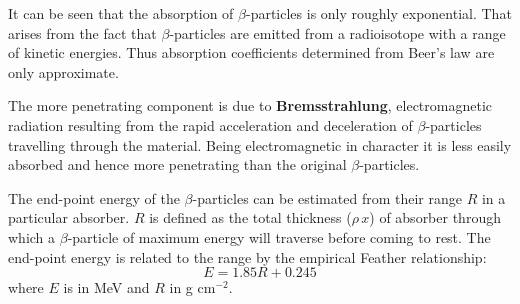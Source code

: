 It can be seen that the absorption of $\beta$-particles is only roughly exponential. That arises from the fact that $\beta$-particles are emitted from a radioisotope with a range of kinetic energies. Thus absorption coefficients determined from Beer's law are only approximate.

The more penetrating component is due to \textbf{Bremsstrahlung}, electromagnetic radiation resulting from the rapid acceleration and deceleration of $\beta$-particles travelling through the material. Being electromagnetic in character it is less easily absorbed and hence more penetrating than the original $\beta$-particles.

The end-point energy of the $\beta$-particles can be estimated from their range $R$ in a particular absorber. $R$ is defined as the total thickness ($\rho \, x$) of absorber through which a $\beta$-particle of maximum energy will traverse before coming to rest. The end-point energy is related to the range by the empirical Feather relationship:
\begin{displaymath}
E = 1.85R + 0.245
\end{displaymath}
where $E$ is in MeV and $R$ in g cm$^{-2}$.